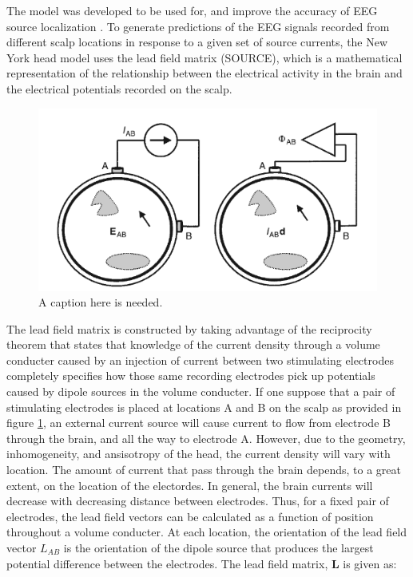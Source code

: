 \documentclass[a4paper, UKenglish, 11pt]{uiomaster}
\begin{document}
The model was developed to be used for, and improve the accuracy of EEG source localization \cite{huang2016new}. To generate predictions of the EEG signals recorded from different scalp locations in response to a given set of source currents, the New York head model uses the lead field matrix (SOURCE), which is a mathematical representation of the relationship between the electrical activity in the brain and the electrical potentials recorded on the scalp.

\begin{figure}
  \includegraphics[width=\linewidth]{figures/lead_fields.png}
  \caption{A caption here is needed.}
  \label{fig:lead_field}
\end{figure}

The lead field matrix is constructed by taking advantage of the reciprocity theorem that states that knowledge of the current density through a volume conducter caused by an injection of current between two stimulating electrodes completely specifies how those same recording electrodes pick up potentials caused by dipole sources in the volume conducter. If one suppose that a pair of stimulating electrodes is placed at locations A and B on the scalp as provided in figure \ref{fig:lead_field}, an external current source will cause current to flow from electrode B through the brain, and all the way to electrode A. However, due to the geometry, inhomogeneity, and ansisotropy of the head, the current density will vary with location. The amount of current that pass through the brain depends, to a great extent, on the location of the electordes. In general, the brain currents will decrease with decreasing distance between electrodes. Thus, for a fixed pair of electrodes, the lead field vectors can be calculated as a function of position throughout a volume conducter. At each location, the orientation of the lead field vector $L_{AB}$ is the orientation of the dipole source that produces the largest potential difference between the electrodes. The lead field matrix, $\boldsymbol{L}$ is given as:
\end{document}
